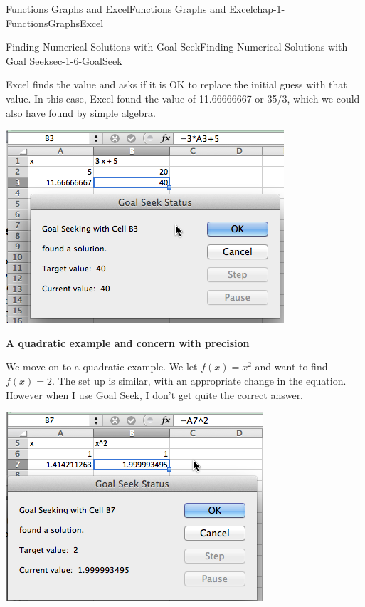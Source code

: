 \documentclass[oneside,10pt,]{book}
\newcommand{\terminology}[1]{\textbf{#1}}
\numberwithin{equation}{section}
\begin{document}
\begin{chapterptx}{Functions Graphs and Excel}{}{Functions Graphs and Excel}{}{}{chap-1-FunctionsGraphsExcel}
\begin{sectionptx}{Finding Numerical Solutions with Goal Seek}{}{Finding Numerical Solutions with Goal Seek}{}{}{sec-1-6-GoalSeek}
\begin{sidebyside}{1}{0.1}{0.1}{0}
\end{sidebyside}%
%
\par
\hypertarget{p-474}{}%
Excel finds the value and asks if it is OK to replace the initial guess with that value.  In this case, Excel found the value of 11.66666667 or 35\slash{}3, which we could also have found by simple algebra. \leavevmode%
\begin{sidebyside}{1}{0.1}{0.1}{0}%
\begin{sbspanel}{0.8}%
\includegraphics[width=1\linewidth]{images/sec1-6-3.png}
\end{sbspanel}%
\end{sidebyside}%
%
\par
\hypertarget{p-475}{}%
\terminology{A quadratic example and concern with precision}%
\par
\hypertarget{p-476}{}%
We move on to a quadratic example.  We let \(f(x)=x^2\) and want to find \(f(x)=2\).  The set up is similar, with an appropriate change in the equation.  However when I use Goal Seek, I don't get quite the correct answer. \begin{sidebyside}{1}{0.1}{0.1}{0}%
\begin{sbspanel}{0.8}%
\includegraphics[width=1\linewidth]{images/sec1-6-4.png}

\end{sbspanel}
\end{sidebyside}
\end{sectionptx}
\end{chapterptx}
\end{document}
